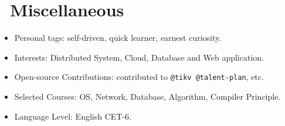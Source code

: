 \documentclass{resume}
\newcommand{\en}[1]{#1}
\newcommand{\zh}[1]{}
\begin{document}
\section{\faInfo\ \en{Miscellaneous}\zh{杂项}}
\begin{itemize}[parsep=0.25ex]
      \item \en{Personal tags: self-driven, quick learner, earnest curiosity.}
            \zh{个人标签：自驱动，学习能力强，做事认真，保持好奇}
      \item \en{Interests: Distributed System, Cloud, Database and Web application.}
            \zh{兴趣领域：分布式系统、云、数据库、Web 应用等}
      \item \en{Open-source Contributions: contributed to \texttt{@tikv @talent-plan}, etc.}
            \zh{开源贡献: 为 \texttt{@tikv @talent-plan} 等项目组织贡献过代码}
      \item \en{Selected Courses: OS, Network, Database, Algorithm, Compiler Principle.}
            \zh{主修课程：操作系统、计算机网络、数据库系统原理、算法设计与分析、编译原理}
      \item \en{Language Level: English CET-6.}
            \zh{语言水平：英语 CET-6}
\end{itemize}
\end{document}
